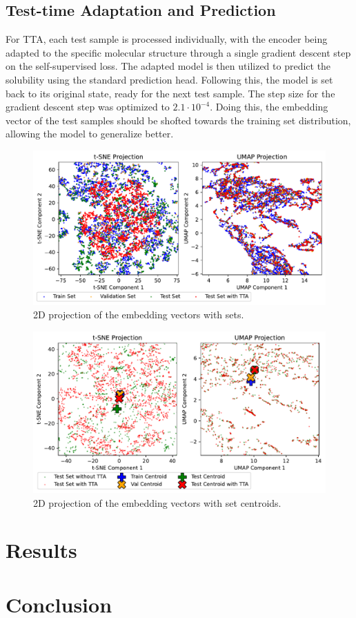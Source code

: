 \documentclass[11pt,a4paper]{article}
\begin{document}
\subsection{Test-time Adaptation and Prediction}

For TTA, each test sample is processed individually, with the encoder being adapted to the specific molecular structure through a single gradient descent step on the self-supervised loss. The adapted model is then utilized to predict the solubility using the standard prediction head. Following this, the model is set back to its original state, ready for the next test sample. The step size for the gradient descent step was optimized to $2.1 \cdot 10^{-4}$. Doing this, the embedding vector of the test samples should be shofted towards the training set distribution, allowing the model to generalize better.

\begin{figure}[htbp]
        \centering
        \includegraphics[width=1\textwidth]{sets.pdf}
        \caption{2D projection of the embedding vectors with sets.}
        \label{fig:sets}
\end{figure}

\begin{figure}[htbp]
        \centering
        \includegraphics[width=1\textwidth]{sets_TTA.pdf}
        \caption{2D projection of the embedding vectors with set centroids.}
        \label{fig:sets_TTA}
\end{figure}

\section{Results}

\section{Conclusion}



\end{document}
